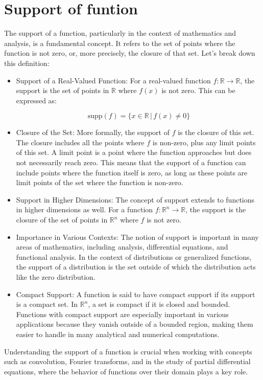 \documentclass[a4paper,12pt]{article} %
\begin{document}
\newpage
\section{\textbf{Support of funtion}}

The support of a function, particularly in the context of mathematics and analysis, is a fundamental concept. It refers to the set of points where the function is not zero, or, more precisely, the closure of that set. Let's break down this definition:

\begin{itemize}
   \item Support of a Real-Valued Function: For a real-valued function \( f: \mathbb{R} \rightarrow \mathbb{R} \), the support is the set of points in \( \mathbb{R} \) where \( f(x) \) is not zero. This can be expressed as:

   \[ \text{supp}(f) = \{ x \in \mathbb{R} \,|\, f(x) \neq 0 \} \]

   \item Closure of the Set: More formally, the support of \( f \) is the closure of this set. The closure includes all the points where \( f \) is non-zero, plus any limit points of this set. A limit point is a point where the function approaches but does not necessarily reach zero. This means that the support of a function can include points where the function itself is zero, as long as these points are limit points of the set where the function is non-zero.

   \item Support in Higher Dimensions: The concept of support extends to functions in higher dimensions as well. For a function \( f: \mathbb{R}^n \rightarrow \mathbb{R} \), the support is the closure of the set of points in \( \mathbb{R}^n \) where \( f \) is not zero.

   \item Importance in Various Contexts: The notion of support is important in many areas of mathematics, including analysis, differential equations, and functional analysis. In the context of distributions or generalized functions, the support of a distribution is the set outside of which the distribution acts like the zero distribution.

   \item Compact Support: A function is said to have compact support if its support is a compact set. In \( \mathbb{R}^n \), a set is compact if it is closed and bounded. Functions with compact support are especially important in various applications because they vanish outside of a bounded region, making them easier to handle in many analytical and numerical computations.

\end{itemize}
Understanding the support of a function is crucial when working with concepts such as convolution, Fourier transforms, and in the study of partial differential equations, where the behavior of functions over their domain plays a key role.
\end{document}
